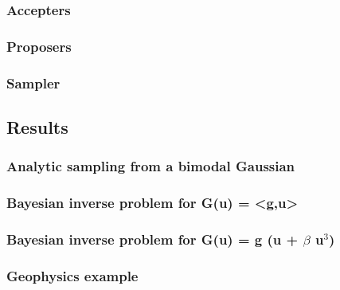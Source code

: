 \documentclass[11pt]{article}
\begin{document}
\subsubsection{Accepters}
\label{sec:org4b97d50}
\subsubsection{Proposers}
\label{sec:org2167606}
\subsubsection{Sampler}
\label{sec:org5d27ded}
\subsection{Results}
\label{sec:org638e047}
\subsubsection{Analytic sampling from a bimodal Gaussian}
\label{sec:org33fe173}
\subsubsection{Bayesian inverse problem for G(u) = <g,u>}
\label{sec:orgfcf4257}
\subsubsection{Bayesian inverse problem for G(u) = g (u + \(\beta\) u\(^{\text{3}}\))}
\label{sec:org1e96fea}
\subsubsection{Geophysics example}
\label{sec:org4e443d5}
\end{document}
